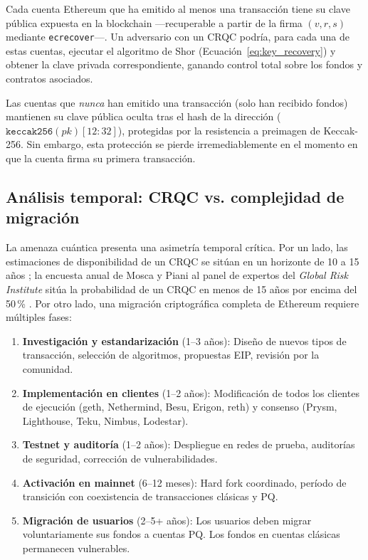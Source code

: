 Cada cuenta Ethereum que ha emitido al menos una transacción tiene su clave pública expuesta en la blockchain ---recuperable a partir de la firma $(v, r, s)$ mediante \texttt{ecrecover}---. Un adversario con un CRQC podría, para cada una de estas cuentas, ejecutar el algoritmo de Shor (Ecuación~\ref{eq:key_recovery}) y obtener la clave privada correspondiente, ganando control total sobre los fondos y contratos asociados.

Las cuentas que \emph{nunca} han emitido una transacción (solo han recibido fondos) mantienen su clave pública oculta tras el hash de la dirección ($\texttt{keccak256}(\mathit{pk})[12{:}32]$), protegidas por la resistencia a preimagen de Keccak-256. Sin embargo, esta protección se pierde irremediablemente en el momento en que la cuenta firma su primera transacción.

\subsection{Análisis temporal: CRQC vs. complejidad de migración}

La amenaza cuántica presenta una asimetría temporal crítica. Por un lado, las estimaciones de disponibilidad de un CRQC se sitúan en un horizonte de 10 a 15 años \parencite{nistpqc2024}; la encuesta anual de Mosca y Piani al panel de expertos del \emph{Global Risk Institute} sitúa la probabilidad de un CRQC en menos de 15 años por encima del 50\,\% \parencite{mosca2018cybersecurity}. Por otro lado, una migración criptográfica completa de Ethereum requiere múltiples fases:

\begin{enumerate}
  \item \textbf{Investigación y estandarización} (1--3 años): Diseño de nuevos tipos de transacción, selección de algoritmos, propuestas EIP, revisión por la comunidad.
  \item \textbf{Implementación en clientes} (1--2 años): Modificación de todos los clientes de ejecución (geth, Nethermind, Besu, Erigon, reth) y consenso (Prysm, Lighthouse, Teku, Nimbus, Lodestar).
  \item \textbf{Testnet y auditoría} (1--2 años): Despliegue en redes de prueba, auditorías de seguridad, corrección de vulnerabilidades.
  \item \textbf{Activación en mainnet} (6--12 meses): Hard fork coordinado, período de transición con coexistencia de transacciones clásicas y PQ.
  \item \textbf{Migración de usuarios} (2--5+ años): Los usuarios deben migrar voluntariamente sus fondos a cuentas PQ. Los fondos en cuentas clásicas permanecen vulnerables.
\end{enumerate}

